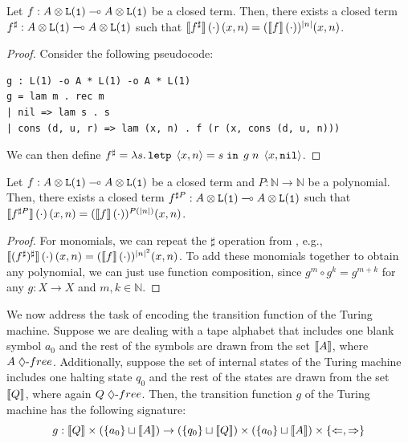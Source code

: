 \begin{lemma}
\label{lem:linear-iterator}
Let $f : \tparr{\tptens{A}{\tplist{\tpunit}}}{\tptens{A}{\tplist{\tpunit}}}$ be a closed term. Then, there exists a closed term $f^{\sharp} : \tparr{\tptens{A}{\tplist{\tpunit}}}{\tptens{A}{\tplist{\tpunit}}}$ such that ${\llbracket f^{\sharp} \rrbracket}\left(\cdot\right) (x, n) = ({\llbracket f \rrbracket}\left(\cdot\right))^{|n|}(x, n)$.
\end{lemma}
\begin{proof}
Consider the following pseudocode:
\begin{lstlisting}
g : L(1) -o A * L(1) -o A * L(1)
g = lam m . rec m
| nil => lam s . s
| cons (d, u, r) => lam (x, n) . f (r (x, cons (d, u, n)))
\end{lstlisting}
We can then define $f^{\sharp} = \tmlam{s}{\tmletp{s}{x}{n}{\tmapp{\tmapp{g}{n}}{\tmpair{x}{\tmnil}}}}$.
\end{proof}

\begin{lemma}
\label{lem:polynomial-iterator}
Let $f : \tparr{\tptens{A}{\tplist{\tpunit}}}{\tptens{A}{\tplist{\tpunit}}}$ be a closed term and $P : \mathbb N \to \mathbb N$ be a polynomial. Then, there exists a closed term $f^{\sharp P} : \tparr{\tptens{A}{\tplist{\tpunit}}}{\tptens{A}{\tplist{\tpunit}}}$ such that ${\llbracket f^{\sharp P} \rrbracket}\left(\cdot\right) (x, n) = ({\llbracket f \rrbracket}\left(\cdot\right))^{P(|n|)}(x, n)$.
\end{lemma}
\begin{proof}
For monomials, we can repeat the $\sharp$ operation from , e.g., ${\llbracket (f^{\sharp})^{\sharp} \rrbracket}\left(\cdot\right) (x, n) = ({\llbracket f \rrbracket}\left(\cdot\right))^{|n|^2}(x, n)$. To add these monomials together to obtain any polynomial, we can just use function composition, since $g^m \circ g^k = g^{m + k}$ for any $g : X \to X$ and $m,k \in \mathbb N$.
\end{proof}


We now address the task of encoding the transition function of the Turing machine.
%
Suppose we are dealing with a tape alphabet that includes one blank symbol $a_0$ and the rest of the symbols are drawn from the set $\llbracket A \rrbracket$, where $\dfree{A}$. Additionally, suppose the set of internal states of the Turing machine includes one halting state $q_0$ and the rest of the states are drawn from the set $\llbracket Q \rrbracket$, where again $\dfree{Q}$. Then, the transition function $g$ of the Turing machine has the following signature:
\[ g : \llbracket Q \rrbracket \times (\{ a_0 \} \sqcup \llbracket A \rrbracket) \to (\{ q_0 \} \sqcup \llbracket Q \rrbracket) \times (\{ a_0 \} \sqcup \llbracket A \rrbracket) \times \{ \Leftarrow, \Rightarrow \} \]

